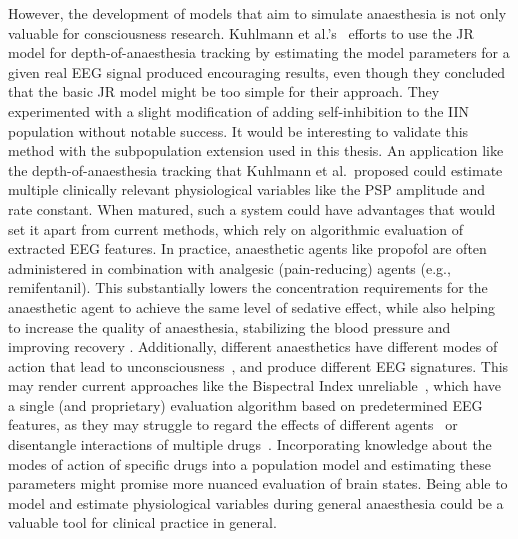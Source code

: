 However, the development of models that aim to simulate anaesthesia is not only valuable for consciousness research.
Kuhlmann et al.'s~\cite{kuhlmann_neural_2016} efforts to use the JR model for depth-of-anaesthesia tracking
by estimating the model parameters for a given real EEG signal produced encouraging results,
even though they concluded that the basic JR model might be too simple for their approach.
They experimented with a slight modification of adding self-inhibition to the IIN population without notable success.
It would be interesting to validate this method with the subpopulation extension used in this thesis.
An application like the depth-of-anaesthesia tracking that Kuhlmann et al.\ proposed
could estimate multiple clinically relevant physiological variables like the PSP amplitude and rate constant.
When matured, such a system could have advantages that would set it apart from current methods,
which rely on algorithmic evaluation of extracted EEG features.
In practice, anaesthetic agents like propofol are often administered in combination with analgesic (pain-reducing)
agents (e.g., remifentanil).
This substantially lowers the concentration requirements for the anaesthetic agent to achieve the same level of
sedative effect,
while also helping to increase the quality of anaesthesia, stabilizing the blood pressure and improving recovery
\cite{chen_propofol_2021}.
Additionally, different anaesthetics have different modes of action that
lead to unconsciousness~\cite{tantirigama_perspective_2020},
and produce different EEG signatures.
This may render current approaches like the Bispectral Index unreliable~\cite{mathur_bispectral_2022},
which have a single (and proprietary) evaluation algorithm based on predetermined EEG features,
as they may struggle to regard the effects of different agents~\cite{avidan_prevention_2011}
or disentangle interactions of multiple drugs~\cite{kuhlmann_neural_2016}.
Incorporating knowledge about the modes of action of specific drugs into a population model
and estimating these parameters might promise more nuanced evaluation of brain states.
Being able to model and estimate physiological variables during general anaesthesia
could be a valuable tool for clinical practice in general.

